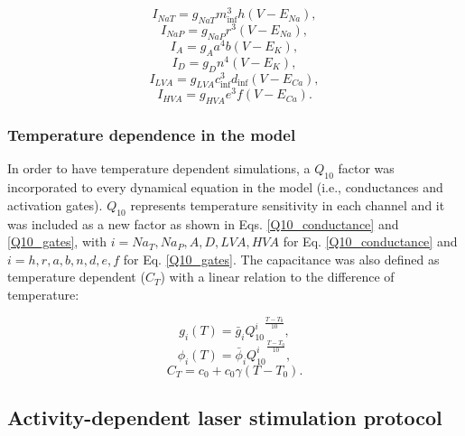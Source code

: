 \begin{equation}
I_{NaT} = g_{NaT} m_{\inf}^3 h (V - E_{Na}),
\end{equation}
\begin{equation}
I_{NaP} = g_{NaP} r^3 (V - E_{Na}),
\end{equation}
\begin{equation}
I_{A} = g_{A} a^4 b (V - E_{K}),
\end{equation}
\begin{equation}
I_{D} = g_{D} n^4 (V - E_{K}),
\end{equation}
\begin{equation}
I_{LVA} = g_{LVA} c_{\inf}^3 d_{\inf} (V - E_{Ca}),
\end{equation}
\begin{equation}
I_{HVA} = g_{HVA} e^3 f (V - E_{Ca}).
\label{eq:channels}
\end{equation}

\subsubsection{Temperature dependence in the model}
\label{sec:model equations temperature}
In order to have temperature dependent simulations, a $Q_{10}$ factor was incorporated to every dynamical equation in the model (i.e., conductances and activation gates). $Q_{10}$ represents temperature sensitivity in each channel and it was included as a new factor as shown in Eqs. \ref{Q10_conductance} and \ref{Q10_gates}, with $i=Na_T,Na_P,A,D,LVA,HVA$ for Eq. \ref{Q10_conductance} and $i=h,r,a,b,n,d,e,f$ for Eq. \ref{Q10_gates}. The capacitance was also defined as temperature dependent ($C_T$) with a linear relation to the difference of temperature: 

\begin{equation}g_i(T)=\bar{g}_i{Q^i_{10}}^{\frac{T-T_0}{10}},
\label{Q10_conductance}
\end{equation}
\begin{equation}\phi_i(T)=\bar{\phi}_i{Q^i_{10}}^{\frac{T-T_0}{10}},
\label{Q10_gates}\end{equation}
\begin{equation}C_T=c_0 + c_0 \gamma(T-T_0).\end{equation}

\subsection{Activity-dependent laser stimulation protocol} 
\label{sect:methods-activity-dependent}

